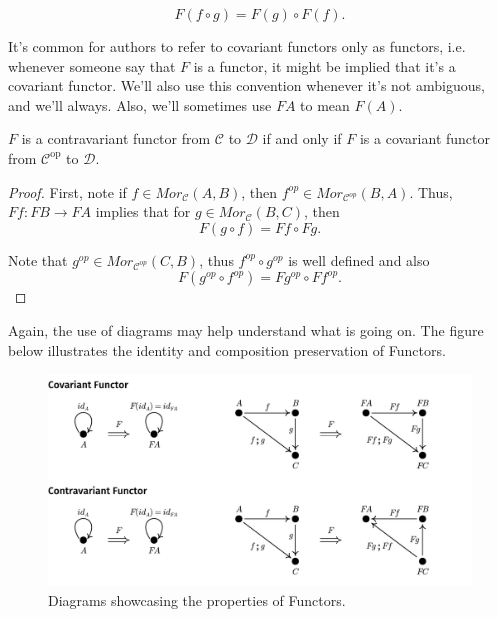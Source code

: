 \begin{definition}[Functor]
\begin{enumerate}[(i)]
\begin{enumerate}
			            \begin{displaymath}
				            F(f \circ g) = F(g) \circ F(f).
			            \end{displaymath}
		      \end{enumerate}
	\end{enumerate}
	It's common for authors to refer to covariant functors only as functors, i.e.
	whenever someone say that $F$ is a functor, it might be implied that it's a covariant functor.
	We'll also use this convention whenever it's not ambiguous, and we'll always.
	Also, we'll sometimes use $FA$ to mean $F(A)$.
\end{definition}

\begin{lemma}
	$F$ is a contravariant functor from $\mathcal C$ to $\mathcal D$ if and only if
	$F$ is a covariant functor from $\mathcal C^{\text{op}}$ to $\mathcal D$.
\end{lemma}
\begin{proof}
	First, note if $f \in Mor_\mathcal C (A,B)$, then $f^{op} \in Mor_{\mathcal C^{op}}(B,A)$.
	Thus, $Ff:FB \to FA$ implies that for $g \in Mor_\mathcal C (B,C)$, then
	\begin{displaymath}
		F(g \circ f) =  F f \circ F g.
	\end{displaymath}

	Note that $g^{op} \in Mor_{\mathcal C^{op}}(C,B)$, thus $f^{op}\circ g^{op}$ is well defined
	and also
	\begin{displaymath}
		F(g^{op} \circ f^{op}) =  F g^{op} \circ F f^{op}.
	\end{displaymath}

\end{proof}

Again, the use of diagrams may help understand what is going on. The figure below
illustrates the identity and composition preservation of Functors.

\begin{figure}[H]
	\begin{center}
		\includegraphics[width=1.1\textwidth]{./notebooks/Functor.pdf}
	\end{center}
	\caption{Diagrams showcasing the properties of Functors.}
	\label{fig:Functor}
\end{figure}

